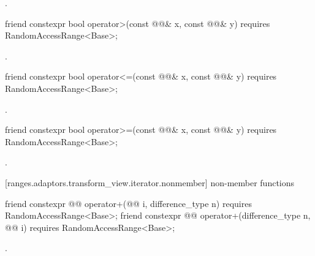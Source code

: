 \begin{itemdescr}
\pnum
\returns {}.
\end{itemdescr}

%
\begin{itemdecl}
friend constexpr bool operator>(const @@& x, const @@& y)
requires RandomAccessRange<Base>;
\end{itemdecl}

\begin{itemdescr}
\pnum
\returns {}.
\end{itemdescr}

%
\begin{itemdecl}
friend constexpr bool operator<=(const @@& x, const @@& y)
requires RandomAccessRange<Base>;
\end{itemdecl}

\begin{itemdescr}
\pnum
\returns {}.
\end{itemdescr}

%
\begin{itemdecl}
friend constexpr bool operator>=(const @@& x, const @@& y)
requires RandomAccessRange<Base>;
\end{itemdecl}

\begin{itemdescr}
\pnum
\returns {}.
\end{itemdescr}

[ranges.adaptors.transform_view.iterator.nonmember]{ non-member functions}

\begin{itemdecl}
friend constexpr @@ operator+(@@ i, difference_type n)
requires RandomAccessRange<Base>;
friend constexpr @@ operator+(difference_type n, @@ i)
requires RandomAccessRange<Base>;
\end{itemdecl}

\begin{itemdescr}
\pnum
\returns {}.
\end{itemdescr}


